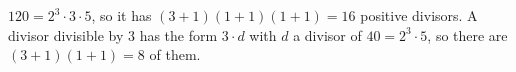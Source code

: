 $120=2^3\cdot3\cdot5$, so it has $(3+1)(1+1)(1+1)=\boxed{16}$ positive divisors. A divisor divisible by $3$ has the form $3\cdot d$ with $d$ a divisor of $40=2^3\cdot5$, so there are $(3+1)(1+1)=\boxed{8}$ of them.

